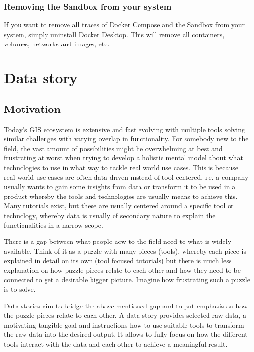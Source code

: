 \documentclass[11pt, a4paper, oneside, parskip=full-]{scrartcl}
\begin{document}
\subsubsection*{Removing the Sandbox from your system}
If you want to remove all traces of Docker Compose and the Sandbox from your
system, simply uninstall Docker Desktop. This will remove all containers,
volumes, networks and images, etc.

\section{Data story}

\subsection{Motivation}
Today's GIS ecosystem is extensive and fast evolving with multiple tools solving
similar challenges with varying overlap in functionality. For somebody new to
the field, the vast amount of possibilities might be overwhelming at best and
frustrating at worst when trying to develop a holistic mental model about what
technologies to use in what way to tackle real world use cases. This is because
real world use cases are often data driven instead of tool centered, i.e. a
company usually wants to gain some insights from data or transform it to be used
in a product whereby the tools and technologies are usually means to achieve
this. Many tutorials exist, but these are usually centered around a specific
tool or technology, whereby data is usually of secondary nature to explain the
functionalities in a narrow scope.

There is a gap between what people new to the field need to what is widely
available. Think of it as a puzzle with many pieces (tools), whereby each piece
is explained in detail on its own (tool focused tutorials) but there is much
less explanation on how puzzle pieces relate to each other and how they need to
be connected to get a desirable bigger picture. Imagine how frustrating such a
puzzle is to solve.

Data stories aim to bridge the above-mentioned gap and to put emphasis on how
the puzzle pieces relate to each other. A data story provides selected raw data,
a motivating tangible goal and instructions how to use suitable tools to
transform the raw data into the desired output. It allows to fully focus on how
the different tools interact with the data and each other to achieve a
meaningful result.
\end{document}
